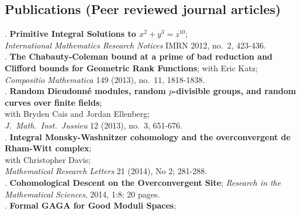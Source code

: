 \documentclass[margin,line]{res}
\newcounter{pubs}
\begin{document}
\begin{resume}





\section{\sc Publications (Peer reviewed journal articles)}
 . \textbf{Primitive Integral Solutions to $x^2 + y^3 = z^{10}$};\\
\emph{International Mathematics Research Notices} IMRN 2012, no.~2, 423-436. \medskip\\
 . \textbf{The Chabauty-Coleman bound at a prime of bad reduction and Clifford bounds for Geometric Rank Functions}; with Eric Katz;\\
\emph{Compositio Mathematica} 149 (2013), no.~11, 1818-1838. \medskip\\
 . \textbf{Random Dieudonn\'e modules, random $p$-divisible groups, and   random curves over finite fields};\\
with Bryden Cais and Jordan Ellenberg;\\
\emph{J.~Math.~Inst.~Jussieu} 12 (2013), no.~3, 651-676. \medskip\\
 . \textbf{Integral Monsky-Washnitzer cohomology and the overconvergent de Rham-Witt complex};\\
with Christopher Davis;\\
\emph{Mathematical Research Letters} 21 (2014), No 2; 281-288. \medskip\\
 . \textbf{Cohomological Descent on the Overconvergent Site}; \emph{Research in the Mathematical Sciences}, 2014, 1:8; 20 pages.\medskip\\
 . \textbf{Formal GAGA for Good Moduli Spaces};\\

\end{resume}
\end{document}
